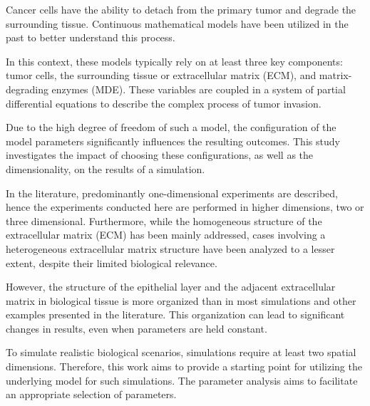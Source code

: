 Cancer cells have the ability to detach from the primary tumor and degrade the surrounding tissue. Continuous mathematical models have been utilized in the past to better understand this process.

In this context, these models typically rely on at least three key components: tumor cells, the surrounding tissue or extracellular matrix (ECM), and matrix-degrading enzymes (MDE). These variables are coupled in a system of partial differential equations to describe the complex process of tumor invasion.

Due to the high degree of freedom of such a model, the configuration of the model parameters significantly influences the resulting outcomes. This study investigates the impact of choosing these configurations, as well as the dimensionality, on the results of a simulation.

In the literature, predominantly one-dimensional experiments are described, hence the experiments conducted here are performed in higher dimensions, two or three dimensional. Furthermore, while the homogeneous structure of the extracellular matrix (ECM) has been mainly addressed, cases involving a heterogeneous extracellular matrix structure have been analyzed to a lesser extent, despite their limited biological relevance.

However, the structure of the epithelial layer and the adjacent extracellular matrix in biological tissue is more organized than in most simulations and other examples presented in the literature. This organization can lead to significant changes in results, even when parameters are held constant.

To simulate realistic biological scenarios, simulations require at least two spatial dimensions. Therefore, this work aims to provide a starting point for utilizing the underlying model for such simulations. The parameter analysis aims to facilitate an appropriate selection of parameters.
